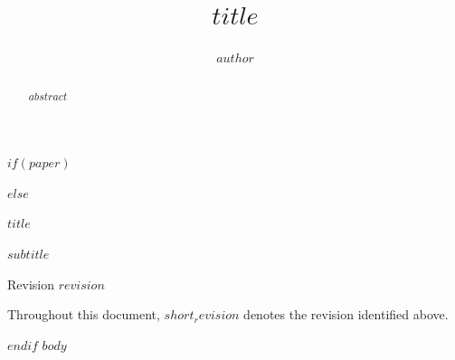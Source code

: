 \documentclass[$if(paper)$10pt$else$11pt$endif$,a4paper]{$if(paper)$amsart$else$article$endif$}
\theoremstyle{plain}
\begin{document}
$if(paper)$
\title{$title$}
\author{$author$}
\begin{abstract}
$abstract$
\end{abstract}
\maketitle
$else$
\thispagestyle{empty}
{\Huge\bfseries $title$\par}
\vspace{0.5em}
{\Large $subtitle$\par}
\vspace{0.5em}
{\large Revision \href{https://github.com/$repository$/tree/$revision$}{\texttt{$revision$}}\par}
\vspace{1em}
\noindent Throughout this document, \href{https://github.com/$repository$/tree/$revision$}{\texttt{$short_revision$}} denotes the revision identified above.\par
$endif$
$body$
\end{document}
